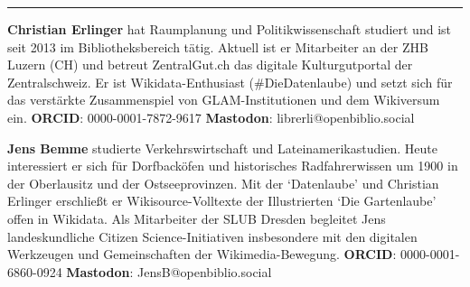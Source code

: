 \begin{center}\rule{0.5\linewidth}{0.5pt}\end{center}

\textbf{Christian Erlinger} hat Raumplanung und Politikwissenschaft
studiert und ist seit 2013 im Bibliotheksbereich tätig. Aktuell ist er
Mitarbeiter an der ZHB Luzern (CH) und betreut ZentralGut.ch das
digitale Kulturgutportal der Zentralschweiz. Er ist Wikidata-Enthusiast
(\#DieDatenlaube) und setzt sich für das verstärkte Zusammenspiel von
GLAM-Institutionen und dem Wikiversum ein. \textbf{ORCID}:
0000-0001-7872-9617 \textbar{} \textbf{Mastodon}:
librerli@openbiblio.social

\textbf{Jens Bemme} studierte Verkehrswirtschaft und
Lateinamerikastudien. Heute interessiert er sich für Dorfbacköfen und
historisches Radfahrerwissen um 1900 in der Oberlausitz und der
Ostseeprovinzen. Mit der `Datenlaube' und Christian Erlinger erschließt
er Wikisource-Volltexte der Illustrierten `Die Gartenlaube' offen in
Wikidata. Als Mitarbeiter der SLUB Dresden begleitet Jens
landeskundliche Citizen Science-Initiativen insbesondere mit den
digitalen Werkzeugen und Gemeinschaften der Wikimedia-Bewegung.
\textbf{ORCID}: 0000-0001-6860-0924 \textbar{} \textbf{Mastodon}:
JensB@openbiblio.social
